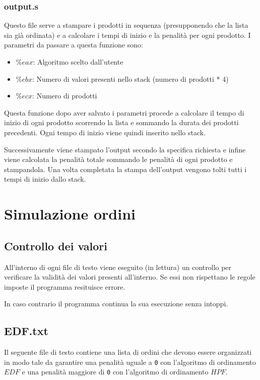 \documentclass[a4paper]{article}
\begin{document}
\subsubsection{output.s}
\label{output}
Questo file serve a stampare i prodotti in sequenza (presupponendo che la lista sia già
ordinata) e a calcolare i tempi di inizio e la penalità per ogni prodotto. I parametri
da passare a questa funzione sono:
\begin{itemize}
	\item \( \%eax \): Algoritmo scelto dall'utente
	\item \( \%ebx \): Numero di valori presenti nello stack (numero di prodotti * 4)
	\item \( \%ecx \): Numero di prodotti
\end{itemize}
Questa funzione dopo aver salvato i parametri procede a calcolare il tempo di inizio
di ogni prodotto scorrendo la lista e sommando la durata dei prodotti precedenti. Ogni
tempo di inizio viene quindi inserito nello stack.

\noindent Successivamente viene stampato l'output secondo la specifica richiesta e infine
viene calcolata la penalità totale sommando le penalità di ogni prodotto e stampandola.
Una volta completata la stampa dell'output vengono tolti tutti i tempi di inizio dallo
stack.


\section{Simulazione ordini}
\subsection{Controllo dei valori}
All'interno di ogni file di testo viene eseguito (in lettura) un controllo per verificare
la validità dei valori presenti all'interno. Se essi non rispettano le regole imposte il
programma resituisce errore.

\noindent In caso contrario il programma continua la sua esecuzione senza intoppi.

\subsection{EDF.txt}
Il seguente file di testo contiene una lista di ordini che devono essere organizzati in
modo tale da garantire una penalità uguale a \texttt{0} con l'algoritmo di ordinamento
\textbf{$EDF$} e una penalità maggiore di \texttt{0} con l'algoritmo di
ordinamento  \textbf{$HPF$}.
\end{document}
